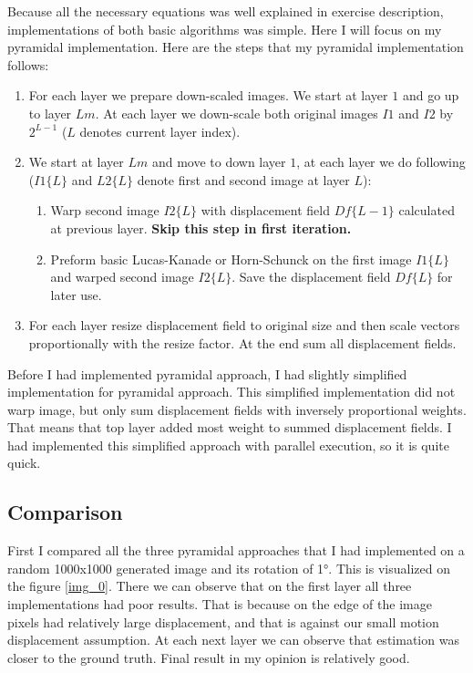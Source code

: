 \documentclass[runningheads]{llncs}
\begin{document}
Because all the necessary equations was well explained in exercise description, implementations of both basic algorithms was simple. Here I will focus on my pyramidal implementation. \newpage Here are the steps that my pyramidal implementation follows:

\begin{enumerate}
    \item For each layer we prepare down-scaled images. We start at layer $1$ and go up to layer $Lm$. At each layer we down-scale both original images $I1$ and $I2$ by $2^{L-1}$ ($L$ denotes current layer index).
    \item We start at layer $Lm$ and move to down layer $1$, at each layer we do following ($I1\{L\}$ and $L2\{L\}$ denote first and second image at layer $L$):
    \begin{enumerate}
        \item Warp second image $I2\{L\}$ with displacement field $Df\{L-1\}$ calculated at previous layer. \textbf{Skip this step in first iteration.}
        \item Preform basic Lucas-Kanade or Horn-Schunck on the first image $I1\{L\}$ and warped second image $I2\{L\}$. Save the  displacement field $Df\{L\}$ for later use.
    \end{enumerate}
    \item For each layer resize displacement field to original size and then scale vectors proportionally with the resize factor. At the end sum all displacement fields.
\end{enumerate}

Before I had implemented pyramidal approach, I had slightly simplified implementation for pyramidal approach. This simplified implementation did not warp image, but only sum displacement fields with inversely proportional weights. That means that top layer added most weight to summed displacement fields. I had implemented this simplified approach with parallel execution, so it is quite quick.

\subsection{Comparison}

First I compared all the three pyramidal approaches that I had implemented on a random 1000x1000 generated image and its rotation of \ang{1}. This is visualized on the figure \ref{img_0}. There we can observe that on the first layer all three implementations had poor results. That is because on the edge of the image pixels had relatively large displacement, and that is against our small motion displacement assumption. At each next layer we can observe that estimation was closer to the ground truth. Final result in my opinion is relatively good.
\end{document}
